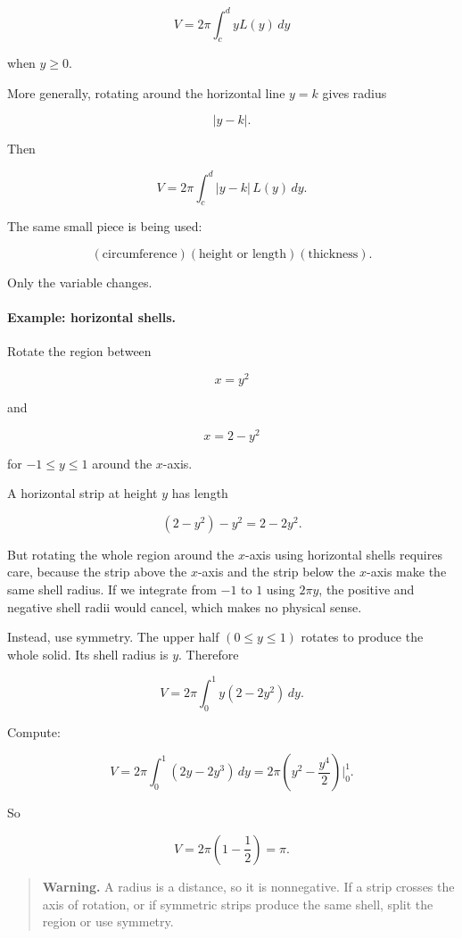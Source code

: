 \[
\boxed{
V=2\pi\int_c^d yL(y)\,dy
}
\]

when \(y\ge0\).

More generally, rotating around the horizontal line \(y=k\) gives radius

\[
|y-k|.
\]

Then

\[
\boxed{
V=2\pi\int_c^d |y-k|\,L(y)\,dy.
}
\]

The same small piece is being used:

\[
(\text{circumference})(\text{height or length})(\text{thickness}).
\]

Only the variable changes.

\paragraph{Example: horizontal shells.}
Rotate the region between

\[
x=y^2
\]

and

\[
x=2-y^2
\]

for \(-1\le y\le1\) around the \(x\)-axis.

A horizontal strip at height \(y\) has length

\[
(2-y^2)-y^2=2-2y^2.
\]

But rotating the whole region around the \(x\)-axis using horizontal shells requires
care, because the strip above the \(x\)-axis and the strip below the \(x\)-axis make
the same shell radius.  If we integrate from \(-1\) to \(1\) using \(2\pi y\), the positive
and negative shell radii would cancel, which makes no physical sense.

Instead, use symmetry.  The upper half \((0\le y\le1)\) rotates to produce the whole
solid.  Its shell radius is \(y\).  Therefore

\[
V=2\pi\int_0^1 y(2-2y^2)\,dy.
\]

Compute:

\[
V=2\pi\int_0^1 (2y-2y^3)\,dy
=
2\pi\left(y^2-\frac{y^4}{2}\right)\Big|_0^1.
\]

So

\[
V=2\pi\left(1-\frac12\right)=\boxed{\pi}.
\]

\begin{quote}
\textbf{Warning.}
A radius is a distance, so it is nonnegative.  If a strip crosses the axis of rotation,
or if symmetric strips produce the same shell, split the region or use symmetry.
\end{quote}

